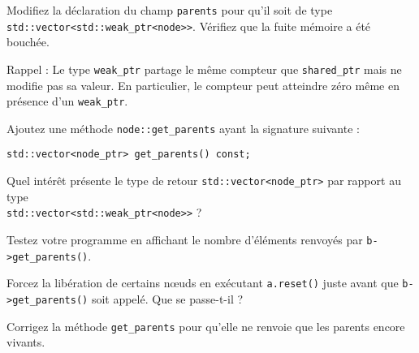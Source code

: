 \documentclass[a4paper]{article}
\begin{document}
Modifiez la déclaration du champ \lstinline|parents| pour qu'il soit de
type \lstinline|std::vector<std::weak_ptr<node>>|. Vérifiez que la fuite
mémoire a été bouchée.

Rappel : Le type \lstinline|weak_ptr| partage le même compteur que
\lstinline|shared_ptr| mais ne modifie pas sa valeur. En particulier, le
compteur peut atteindre zéro même en présence d'un \lstinline|weak_ptr|.

Ajoutez une méthode \lstinline|node::get_parents| ayant la signature
suivante :
\begin{lstlisting}
std::vector<node_ptr> get_parents() const;
\end{lstlisting}

Quel intérêt présente le type de retour \lstinline|std::vector<node_ptr>|
par rapport au type\\ \lstinline|std::vector<std::weak_ptr<node>>| ?

Testez votre programme en affichant le nombre d'éléments renvoyés par
\lstinline|b->get_parents()|.

Forcez la libération de certains nœuds en exécutant \lstinline|a.reset()|
juste avant que \lstinline|b->get_parents()| soit appelé. Que se
passe-t-il ?

Corrigez la méthode \lstinline|get_parents| pour qu'elle ne renvoie que
les parents encore vivants.
\end{document}
